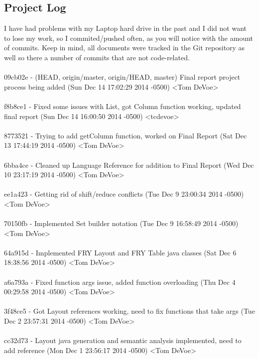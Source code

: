 \documentclass{article}
\newenvironment{allintypewriter}{\ttfamily}{\par}
\begin{document}
\subsection{Project Log}
I have had problems with my Laptop hard drive in the past and I did not want to lose my work, so I commited/pushed often, as you will notice with the amount of commits. Keep in mind, all documents were tracked in the Git repository as well so there a number of commits that are not code-related.
\\ \\
\begin{allintypewriter}
09cb02e - (HEAD, origin/master, origin/HEAD, master) Final report project process being added (Sun Dec 14 17:02:29 2014 -0500) <Tom DeVoe>
\\ \\
f8b8ce1 - Fixed some issues with List, got Column function working, updated final report (Sun Dec 14 16:00:50 2014 -0500) <tcdevoe>
\\ \\
8773521 - Trying to add getColumn function, worked on Final Report (Sat Dec 13 17:44:19 2014 -0500) <Tom DeVoe>
\\ \\
6bba4ce - Cleaned up Language Reference for addition to Final Report (Wed Dec 10 23:17:19 2014 -0500) <Tom DeVoe>
\\ \\
ee1a423 - Getting rid of shift/reduce conflicts (Tue Dec 9 23:00:34 2014 -0500) <Tom DeVoe>
\\ \\
70150fb - Implemented Set builder notation (Tue Dec 9 16:58:49 2014 -0500) <Tom DeVoe>
\\ \\
64a915d - Implemented FRY Layout and FRY Table java classes (Sat Dec 6 18:38:56 2014 -0500) <Tom DeVoe>
\\ \\
a6a793a - Fixed function args issue, added function overloading (Thu Dec 4 00:29:58 2014 -0500) <Tom DeVoe>
\\ \\
3f48ce5 - Got Layout references working, need to fix functions that take args (Tue Dec 2 23:57:31 2014 -0500) <Tom DeVoe>
\\ \\
cc32d73 - Layout java generation and semantic analysis implemented, need to add reference (Mon Dec 1 23:56:17 2014 -0500) <Tom DeVoe>
\\ \\

\end{allintypewriter}
\end{document}
